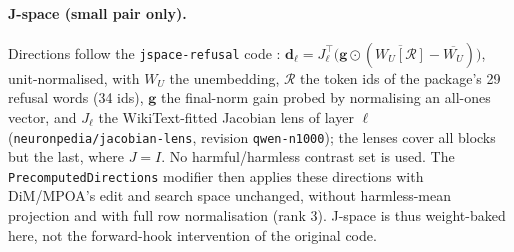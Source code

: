 \paragraph{J-space (small pair only).} Directions follow the
\texttt{jspace-refusal} code
\cite{sekinal2026jspace,neuronpedia2026jacobian,gurnee2026verbalizable}:
$\mathbf{d}_\ell=J_\ell^{\top}\big(\mathbf{g}\odot(\overline{W_U[\mathcal{R}]}-\overline{W_U})\big)$,
unit-normalised, with $W_U$ the unembedding, $\mathcal{R}$ the token ids of the
package's 29 refusal words (34 ids), $\mathbf{g}$ the final-norm gain probed by
normalising an all-ones vector, and $J_\ell$ the WikiText-fitted Jacobian lens
of layer $\ell$ (\texttt{neuronpedia/jacobian-lens}, revision
\texttt{qwen-n1000}); the lenses cover all blocks but the last, where $J=I$. No
harmful/harmless contrast set is used. The \texttt{PrecomputedDirections}
modifier then applies these directions with DiM/MPOA's edit and search space
unchanged, without harmless-mean projection and with full row normalisation
(rank 3). J-space is thus weight-baked here, not the forward-hook intervention
of the original code.

